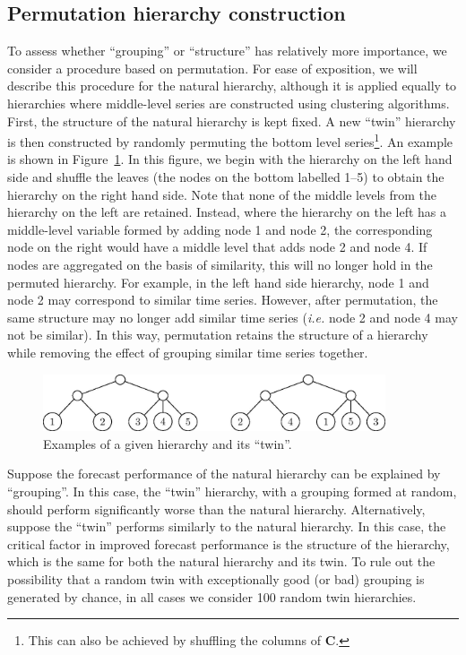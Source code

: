 \documentclass[a4paper,review,12pt,authoryear]{elsarticle}
\begin{document}
\subsection{Permutation hierarchy construction}
\label{subsec:permutation}

 


To assess whether ``grouping'' or ``structure'' has relatively more importance, we consider a procedure based on permutation. For ease of exposition, we will describe this procedure for the natural hierarchy, although it is applied equally to hierarchies where middle-level series are constructed using clustering algorithms. First, the structure of the natural hierarchy is kept fixed. A new ``twin'' hierarchy is then constructed by randomly permuting the bottom level series\footnote{This can also be achieved by shuffling the columns of $\boldsymbol{C}$.}. An example is shown in Figure~\ref{fig:aggcluster_random}. { In this figure, we begin with the hierarchy on the left hand side and shuffle the leaves (the nodes on the bottom labelled 1--5) to obtain the hierarchy on the right hand side. Note that none of the middle levels from the hierarchy on the left are retained. Instead, where the hierarchy on the left has a middle-level variable formed by adding node 1 and node 2, the corresponding node on the right would have a middle level that adds node 2 and node 4. %
If nodes are aggregated on the basis of similarity, this will no longer hold in the permuted hierarchy. For example, in the left hand side hierarchy, node 1 and node 2 may correspond to similar time series. However, after permutation, the same structure may no longer add similar time series (\textit{i.e.} node 2 and node 4 may not be similar). In this way, permutation retains the structure of a hierarchy while removing the effect of grouping similar time series together.}



\begin{figure}[!h]
    \centering
    \includegraphics[width=0.9\textwidth]{../figures/Figure5.jpg}
\caption{\label{fig:aggcluster_random}Examples of a given hierarchy and its ``twin''. }
\end{figure}

Suppose the forecast performance of the natural hierarchy can be explained by ``grouping''. In this case, the ``twin'' hierarchy, with a grouping formed at random, should perform significantly worse than the natural hierarchy. Alternatively, suppose the ``twin'' performs similarly to the natural hierarchy. In this case, the critical factor in improved forecast performance is the structure of the hierarchy, which is the same for both the natural hierarchy and its twin. To rule out the possibility that a random twin with exceptionally good (or bad) grouping is generated by chance, in all cases we consider 100 random twin hierarchies.
\end{document}
